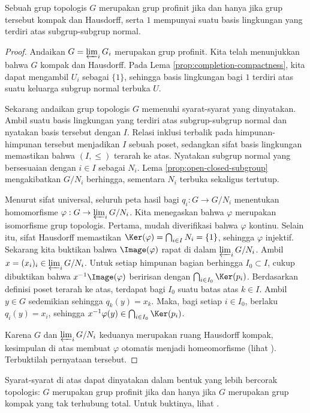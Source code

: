 \begin{theorem}\label{prop:profinite-characterization}
	Sebuah grup topologis $G$ merupakan grup profinit jika dan hanya jika grup tersebut kompak dan Hausdorff, serta $1$ mempunyai suatu basis lingkungan yang terdiri atas subgrup-subgrup normal.
\end{theorem}
\begin{proof}
	Andaikan $G = \varprojlim_i G_i$ merupakan grup profinit. Kita telah menunjukkan bahwa $G$ kompak dan Hausdorff. Pada Lema \ref{prop:completion-compactness}, kita dapat mengambil $U_i$ sebagai $\{1\}$, sehingga basis lingkungan bagi $1$ terdiri atas suatu keluarga subgrup normal terbuka $U$.

	Sekarang andaikan grup topologis $G$ memenuhi syarat-syarat yang dinyatakan. Ambil suatu basis lingkungan yang terdiri atas subgrup-subgrup normal dan nyatakan basis tersebut dengan $I$. Relasi inklusi terbalik pada himpunan-himpunan tersebut menjadikan $I$ sebuah poset, sedangkan sifat basis lingkungan memastikan bahwa $(I, \leq)$ terarah ke atas. Nyatakan subgrup normal yang bersesuaian dengan $i \in I$ sebagai $N_i$. Lema \ref{prop:open-closed-subgroup} mengakibatkan $G/N_i$ berhingga, sementara $N_i$ terbuka sekaligus tertutup.

	Menurut sifat universal, seluruh peta hasil bagi $q_i: G \to G/N_i$ menentukan homomorfisme $\varphi: G \to \varprojlim_i G/N_i$. Kita menegaskan bahwa $\varphi$ merupakan isomorfisme grup topologis. Pertama, mudah diverifikasi bahwa $\varphi$ kontinu. Selain itu, sifat Hausdorff memastikan $\Ker(\varphi) = \bigcap_{i \in I} N_i = \{1\}$, sehingga $\varphi$ injektif. Sekarang kita buktikan bahwa $\Image(\varphi)$ rapat di dalam $\varprojlim_i G/N_i$. Ambil $x = (x_i)_i \in \varprojlim_i G/N_i$. Untuk setiap himpunan bagian berhingga $I_0 \subset I$, cukup dibuktikan bahwa $x^{-1} \Image(\varphi)$ beririsan dengan $\bigcap_{i \in I_0} \Ker(p_i)$. Berdasarkan definisi poset terarah ke atas, terdapat bagi $I_0$ suatu batas atas $k \in I$. Ambil $y \in G$ sedemikian sehingga $q_k(y) = x_k$. Maka, bagi setiap $i \in I_0$, berlaku $q_i(y) = x_i$, sehingga $x^{-1} \varphi(y) \in \bigcap_{i \in I_0} \Ker(p_i)$.

	Karena $G$ dan $\varprojlim_i G/N_i$ keduanya merupakan ruang Hausdorff kompak, kesimpulan di atas membuat $\varphi$ otomatis menjadi homeomorfisme (lihat \cite[\S 7.2]{Xiong}). Terbuktilah pernyataan tersebut.
\end{proof}
\begin{remark}\label{rem:totally-disconnected}
	Syarat-syarat di atas dapat dinyatakan dalam bentuk yang lebih bercorak topologis: $G$ merupakan grup profinit jika dan hanya jika $G$ merupakan grup kompak yang tak terhubung total. Untuk buktinya, lihat \cite[Proposisi 1.9.3]{FL14}.
\end{remark}

